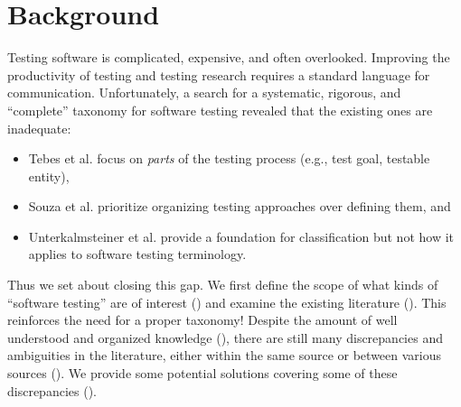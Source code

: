 \section{Background}


Testing software is complicated, expensive, and often overlooked.
Improving the productivity of testing and testing research requires a standard
language for communication. Unfortunately, a search
for a systematic, rigorous, and ``complete'' taxonomy for software testing
revealed that the existing ones are inadequate:

\begin{itemize}
    \item \ifnotpaper\else Tebes et al. \fi\citet{TebesEtAl2020a} focus on
          \emph{parts} of the testing process (e.g., test goal, testable entity),
    \item \ifnotpaper\else Souza et al. \fi\citet{SouzaEtAl2017} prioritize
          organizing testing approaches over defining them, and
    \item \ifnotpaper\else Unterkalmsteiner et al. \fi\citet{UnterkalmsteinerEtAl2014}
          provide a foundation for classification but not how it applies to software
          testing terminology.
\end{itemize}

Thus we set about closing this gap. We first define the scope of what kinds of
``software testing'' are of interest () and examine the existing
literature (). This reinforces the need for a proper taxonomy!
Despite the amount of well understood and organized knowledge (),
there are still many discrepancies and ambiguities in the literature, either
within the same source or between various sources (). We provide
some potential solutions covering some of these discrepancies ().